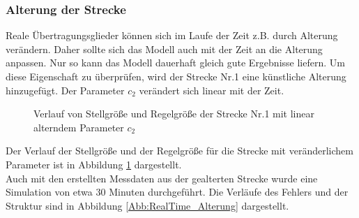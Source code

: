             \subsubsection{Alterung der Strecke}
                Reale Übertragungsglieder können sich im Laufe der Zeit z.B. durch Alterung verändern. Daher sollte sich das Modell auch mit der Zeit an die Alterung anpassen.
                Nur so kann das Modell dauerhaft gleich gute Ergebnisse liefern. Um diese Eigenschaft zu überprüfen, wird der Strecke Nr.1 eine künstliche Alterung hinzugefügt. 
                Der Parameter $c_2$ verändert sich linear mit der Zeit.
                \begin{figure}[h]
                    \caption{Verlauf von Stellgröße und Regelgröße der Strecke Nr.1 mit linear alterndem Parameter $c_2$}
                    \label{Abb:Alterung}
                \end{figure}
                Der Verlauf der Stellgröße und der Regelgröße für die Strecke mit veränderlichem Parameter ist in Abbildung 
                \ref{Abb:Alterung} dargestellt.\\
                Auch mit den erstellten Messdaten aus der gealterten Strecke wurde eine Simulation von etwa 30 Minuten durchgeführt. Die Verläufe des Fehlers und der Struktur sind
                in Abbildung \ref{Abb:RealTime_Alterung} dargestellt.
